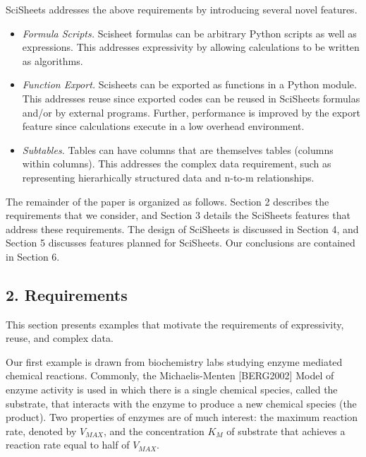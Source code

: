 \documentclass[letterpaper,compsoc,twoside]{IEEEtran}
\begin{document}
SciSheets addresses the above requirements by introducing
several novel features.%
\begin{itemize}

\item 

\emph{Formula Scripts.}
Scisheet formulas can be arbitrary Python scripts as well as expressions.
This addresses expressivity by allowing
calculations to be written as algorithms.
\item 

\emph{Function Export.}
Scisheets can be exported as functions in a Python module.
This addresses reuse since
exported codes
can be reused in SciSheets formulas and/or by
external programs.
Further, performance is improved by the export feature
since calculations execute
in a low overhead environment.
\item 

\emph{Subtables.}
Tables can have columns that are themselves tables (columns within columns).
This addresses the complex data requirement,
such as representing hierarhically structured
data and n-to-m relationships.
\end{itemize}


The remainder of the paper is organized as follows.
Section 2 describes the requirements that we consider, and
Section 3 details the SciSheets features that address these requirements.
The design of SciSheets is discussed in Section 4, and
Section 5 discusses features planned for SciSheets.
Our conclusions are contained in Section 6.

\subsection{2. Requirements%
  \label{requirements}%
}


This section presents examples that motivate
the requirements of expressivity, reuse, and complex data.

Our first example is drawn from biochemistry labs
studying enzyme mediated chemical reactions.
Commonly, the Michaelis-Menten {[}BERG2002{]} Model of enzyme activity is used in which
there is a single chemical species, called the substrate, that interacts with the enzyme to produce
a new chemical species (the product).
Two properties of enzymes are of much interest: the maximum reaction rate,
denoted by $V_{MAX}$, and the concentration $K_M$ of substrate that achieves
a reaction rate equal to half of $V_{MAX}$.
\end{document}
